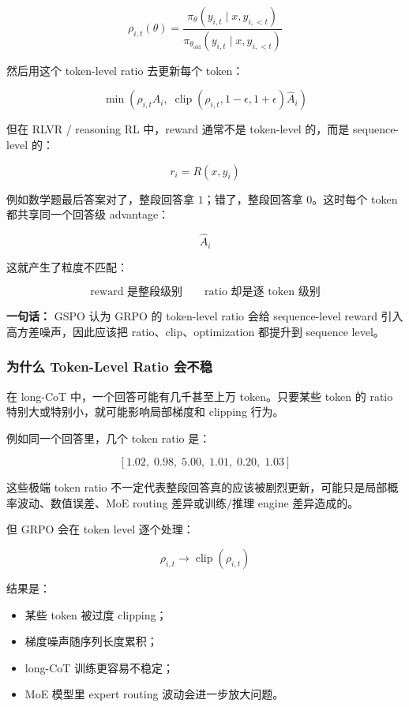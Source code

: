 \[
\rho_{i,t}(\theta)
=
\frac{
\pi_\theta(y_{i,t}\mid x,y_{i,<t})
}{
\pi_{\theta_\text{old}}(y_{i,t}\mid x,y_{i,<t})
}
\]

然后用这个 token-level ratio 去更新每个 token：

\[
\min
\left(
\rho_{i,t}\hat{A}_i,\;
\operatorname{clip}(\rho_{i,t},1-\epsilon,1+\epsilon)\hat{A}_i
\right)
\]

但在 RLVR / reasoning RL 中，reward 通常不是 token-level 的，而是 sequence-level 的：

\[
r_i = R(x,y_i)
\]

例如数学题最后答案对了，整段回答拿 $1$；错了，整段回答拿 $0$。这时每个 token 都共享同一个回答级 advantage：

\[
\hat{A}_i
\]

这就产生了粒度不匹配：

\[
\text{reward 是整段级别}
\qquad
\text{ratio 却是逐 token 级别}
\]

\begin{summarybox}
\textbf{一句话：} GSPO 认为 GRPO 的 token-level ratio 会给 sequence-level reward 引入高方差噪声，因此应该把 ratio、clip、optimization 都提升到 sequence level。
\end{summarybox}

\subsubsection{为什么 Token-Level Ratio 会不稳}

在 long-CoT 中，一个回答可能有几千甚至上万 token。只要某些 token 的 ratio 特别大或特别小，就可能影响局部梯度和 clipping 行为。

例如同一个回答里，几个 token ratio 是：

\[
[1.02,\;0.98,\;5.00,\;1.01,\;0.20,\;1.03]
\]

这些极端 token ratio 不一定代表整段回答真的应该被剧烈更新，可能只是局部概率波动、数值误差、MoE routing 差异或训练/推理 engine 差异造成的。

但 GRPO 会在 token level 逐个处理：

\[
\rho_{i,t}
\to
\operatorname{clip}(\rho_{i,t})
\]

结果是：

\begin{itemize}[leftmargin=1.5em]
  \item 某些 token 被过度 clipping；
  \item 梯度噪声随序列长度累积；
  \item long-CoT 训练更容易不稳定；
  \item MoE 模型里 expert routing 波动会进一步放大问题。
\end{itemize}

